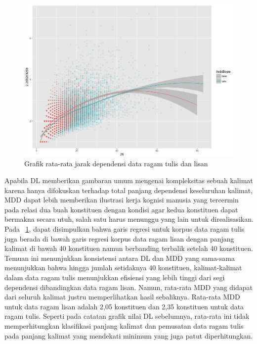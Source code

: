 \begin{figure}
	\centering \includegraphics[width=1
	\textwidth] {pics/lisantulis_MDD.png} 
	\caption{Grafik rata-rata jarak dependensi data ragam tulis dan lisan} 
\label{fig:lisantulis_MDD} 
\end{figure}

Apabila DL memberikan gambaran umum mengenai kompleksitas sebuah kalimat karena hanya difokuskan terhadap total panjang dependensi keseluruhan kalimat, MDD dapat lebih memberikan ilustrasi kerja kognisi manusia yang tercermin pada relasi dua buah konstituen dengan kondisi agar kedua konstituen dapat bermakna secara utuh, salah satu harus menunggu yang lain untuk direalisasikan. Pada \pic~\ref{fig:lisantulis_MDD}, dapat disimpulkan bahwa garis regresi untuk korpus data ragam tulis juga berada di bawah garis regresi korpus data ragam lisan dengan panjang kalimat di bawah 40 konstituen namun berbanding terbalik setelah 40 konstituen. Temuan ini menunjukkan konsistensi antara DL dan MDD yang sama-sama menunjukkan bahwa hingga jumlah setidaknya 40 konstituen, kalimat-kalimat dalam data ragam tulis menunjukkan efisiensi yang lebih tinggi dari segi dependensi dibandingkan data ragam lisan. Namun, rata-rata MDD yang didapat dari seluruh kalimat justru memperlihatkan hasil sebaliknya. Rata-rata MDD untuk data ragam lisan adalah 2,05 konstituen dan 2,35 konstituen untuk data ragam tulis. Seperti pada catatan grafik nilai DL sebelumnya, rata-rata ini tidak memperhitungkan klasifikasi panjang kalimat dan pemusatan data ragam tulis pada panjang kalimat yang mendekati minimum yang juga patut diperhitungkan.

